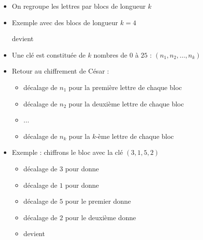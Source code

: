 \begin{frame}

\hfill\hfill{}

\begin{itemize}
  \item On regroupe les lettres par blocs de longueur $k$
  \pause
  \item Exemple avec des blocs de longueur $k=4$ \\
  
\centerline{}
\pause
devient \\
\centerline{}
  \pause
  \item Une clé est constituée de $k$ nombres de $0$ à $25$ : $(n_1,n_2,\ldots,n_k)$
  \pause
  \item Retour au chiffrement de César : 
\begin{itemize}
\pause
  \item décalage de $n_1$ pour la première lettre de chaque bloc
  \pause
  \item décalage de $n_2$ pour la deuxième lettre de chaque bloc
  \pause
  \item ...
  \item décalage de $n_k$ pour la $k$-ème lettre de chaque bloc 
\end{itemize}

  \pause
  \item Exemple : chiffrons le bloc  avec la clé $(3,1,5,2)$
  \pause
  \begin{itemize}[<+->]
  \item décalage de $3$ pour  donne 
  \item décalage de $1$ pour  donne 
  \item décalage de $5$ pour le premier  donne 
  \item décalage de $2$ pour le deuxième  donne 
  \item {} devient 
\end{itemize}

\end{itemize}

\end{frame}

